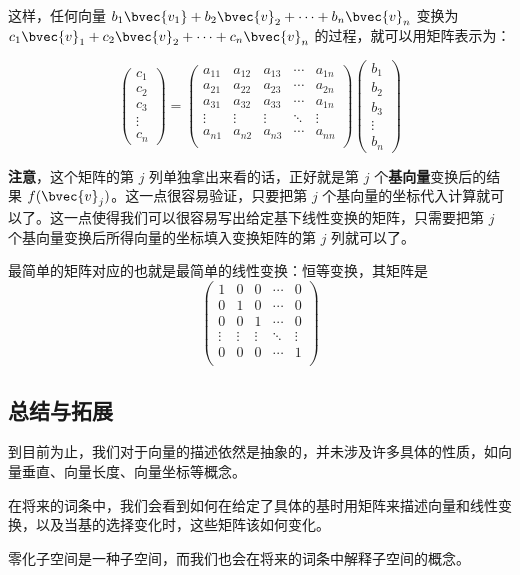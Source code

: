 这样，任何向量 $b_1\bvec{v_1}+b_2\bvec{v}_2+\cdots+b_n\bvec{v}_n$ 变换为 $c_1\bvec{v}_1+c_2\bvec{v}_2+\cdots+c_n\bvec{v}_n$ 的过程，就可以用矩阵表示为：

\begin{equation}
\begin{pmatrix}
c_1\\c_2\\c_3\\\vdots\\c_n
\end{pmatrix}
=
    \begin{pmatrix}
    a_{11}&a_{12}&a_{13}&\cdots&a_{1n}\\
    a_{21}&a_{22}&a_{23}&\cdots&a_{2n}\\
    a_{31}&a_{32}&a_{33}&\cdots&a_{1n}\\
    \vdots&\vdots&\vdots&\ddots&\vdots\\
    a_{n1}&a_{n2}&a_{n3}&\cdots&a_{nn}\\
    \end{pmatrix}
    \begin{pmatrix}
    b_1\\b_2\\b_3\\\vdots\\b_n
    \end{pmatrix}
\end{equation}

\textbf{注意}，这个矩阵的第 $j$ 列单独拿出来看的话，正好就是第 $j$ 个\textbf{基向量}变换后的结果 $f(\bvec{v}_j)$。这一点很容易验证，只要把第 $j$ 个基向量的坐标代入计算就可以了。这一点使得我们可以很容易写出给定基下线性变换的矩阵，只需要把第 $j$ 个基向量变换后所得向量的坐标填入变换矩阵的第 $j$ 列就可以了。

最简单的矩阵对应的也就是最简单的线性变换：恒等变换，其矩阵是
\begin{equation}
    \begin{pmatrix}
1&0&0&\cdots&0\\
0&1&0&\cdots&0\\
0&0&1&\cdots&0\\
\vdots&\vdots&\vdots&\ddots&\vdots\\
0&0&0&\cdots&1\\
    \end{pmatrix}
\end{equation}


\subsection{总结与拓展}

到目前为止，我们对于向量的描述依然是抽象的，并未涉及许多具体的性质，如向量垂直、向量长度、向量坐标等概念。

在将来的词条中，我们会看到如何在给定了具体的基时用矩阵来描述向量和线性变换，以及当基的选择变化时，这些矩阵该如何变化。

零化子空间是一种子空间，而我们也会在将来的词条中解释子空间的概念。
